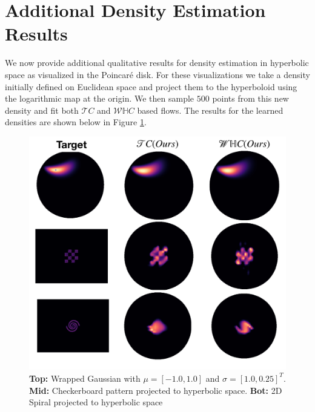 \section{Additional Density Estimation Results}
\label{additional_results}
We now provide additional qualitative results for density estimation in hyperbolic space as visualized in the Poincar\'e disk. For these visualizations we take a density initially defined on Euclidean space and project them to the hyperboloid using the logarithmic map at the origin. We then sample $500$ points from this new density and fit both $\mathcal{T}C$ and $\mathcal{W}\mathbb{H}C$ based flows. The results for the learned densities are shown below in Figure \ref{fig:additional_density_estimation}.


\begin{figure}[ht]
     \centering
     \includegraphics[width=0.95\linewidth]{additional_examples_hyperbolic_density.pdf}
     \caption{\textbf{Top:} Wrapped Gaussian with $\mu = [-1.0,1.0]$ and $\sigma = [1.0, 0.25]^T$. \textbf{Mid:} Checkerboard pattern projected to hyperbolic space. \textbf{Bot:} 2D Spiral projected to hyperbolic space}
     \label{fig:additional_density_estimation}
 \end{figure}
 
 
 
